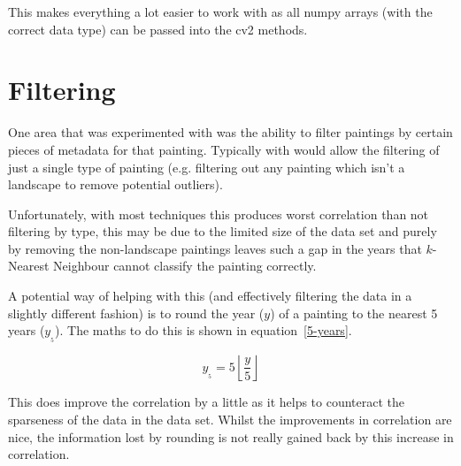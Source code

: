 This makes everything a lot easier to work with as all numpy arrays (with the correct data type)
can be passed into the \gls{cv2} methods.


\section{Filtering}
One area that was experimented with was the ability to filter paintings by certain pieces of 
metadata for that painting. Typically with would allow the filtering of just a single type of
painting (e.g. filtering out any painting which isn't a landscape to remove potential outliers).

Unfortunately, with most techniques this produces worst correlation than not filtering by type,
this may be due to the limited size of the data set and purely by removing the non-landscape 
paintings leaves such a gap in the years that $k$-Nearest Neighbour cannot classify the painting
correctly.

A potential way of helping with this (and effectively filtering the data in a slightly different
fashion) is to round the year ($y$) of a painting to the nearest 5 years ($y_{_{5}}$). The maths 
to do this is shown in equation~\ref{5-years}. 

\begin{equation}\label{5-years}
y_{_{5}} = 5\left\lfloor\frac{y}{5} \right\rfloor
\end{equation}

This does improve the correlation by a little as it helps to counteract the sparseness of the data
in the data set. Whilst the improvements in correlation are nice, the information lost by rounding
is not really gained back by this increase in correlation.
